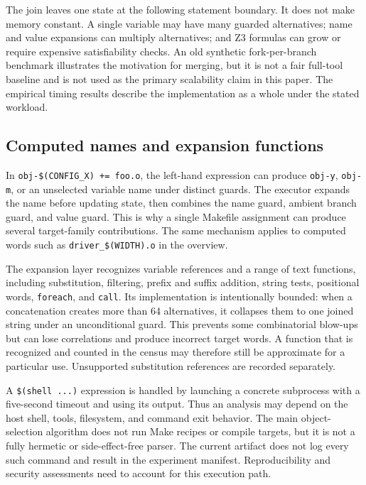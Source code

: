 \documentclass[acmsmall,screen,review]{acmart}
\begin{document}
The join leaves one state at the following statement boundary. It does not make memory constant. A single variable may have many guarded alternatives; name and value expansions can multiply alternatives; and Z3 formulas can grow or require expensive satisfiability checks. An old synthetic fork-per-branch benchmark illustrates the motivation for merging, but it is not a fair full-tool baseline and is not used as the primary scalability claim in this paper. The empirical timing results describe the implementation as a whole under the stated workload.

\subsection{Computed names and expansion functions}
In \texttt{obj-\$(CONFIG\_X) += foo.o}, the left-hand expression can produce \texttt{obj-y}, \texttt{obj-m}, or an unselected variable name under distinct guards. The executor expands the name before updating state, then combines the name guard, ambient branch guard, and value guard. This is why a single Makefile assignment can produce several target-family contributions. The same mechanism applies to computed words such as \texttt{driver\_\$(WIDTH).o} in the overview.

The expansion layer recognizes variable references and a range of text functions, including substitution, filtering, prefix and suffix addition, string tests, positional words, \texttt{foreach}, and \texttt{call}. Its implementation is intentionally bounded: when a concatenation creates more than 64 alternatives, it collapses them to one joined string under an unconditional guard. This prevents some combinatorial blow-ups but can lose correlations and produce incorrect target words. A function that is recognized and counted in the census may therefore still be approximate for a particular use. Unsupported substitution references are recorded separately.

A \texttt{\$(shell ...)} expression is handled by launching a concrete subprocess with a five-second timeout and using its output. Thus an analysis may depend on the host shell, tools, filesystem, and command exit behavior. The main object-selection algorithm does not run Make recipes or compile targets, but it is not a fully hermetic or side-effect-free parser. The current artifact does not log every such command and result in the experiment manifest. Reproducibility and security assessments need to account for this execution path.
\end{document}
